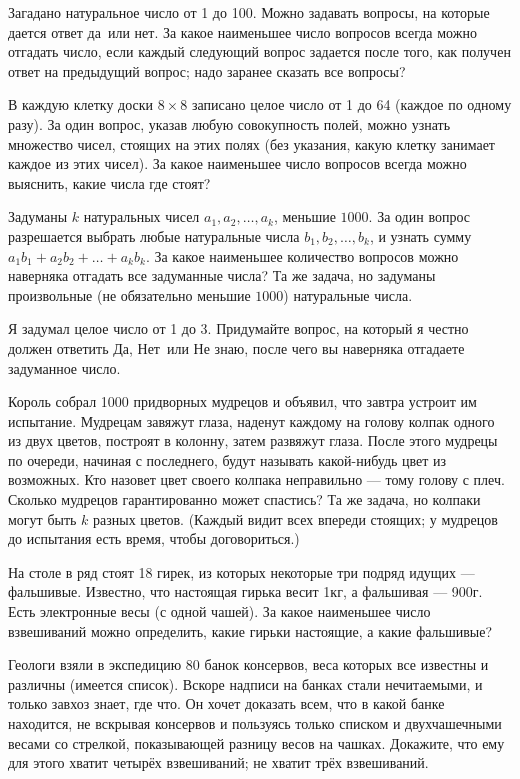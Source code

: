\documentclass[a4paper,12pt]{article}
\begin{document}

Загадано натуральное число от 1 до 100. Можно задавать вопросы,
на которые дается ответ  да\ или  нет. За какое наименьшее число
вопросов всегда можно отгадать число, если
каждый следующий вопрос задается после того, как
получен ответ на предыдущий вопрос;
надо заранее сказать все вопросы?


В каждую клетку доски $8\times8$ записано целое число от 1 до 64
(каждое по одному разу).
За один вопрос, указав любую совокупность полей, можно
узнать множество чисел, стоящих на этих полях
(без указания, какую клетку занимает каждое из этих чисел).
За какое наименьшее число
вопросов всегда можно выяснить, какие числа где стоят?



Задуманы $k$ натуральных чисел $a_1, a_2,\ldots ,a_k$, меньшие $1000$.
За один вопрос разрешается выбрать любые натуральные числа
$b_1, b_2,\ldots ,b_k$, и узнать сумму $a_1b_1+a_2b_2+\ldots +a_kb_k$.
За какое наименьшее количество вопросов можно наверняка
отгадать все задуманные числа?
 Та же задача, но задуманы произвольные (не обязательно
меньшие $1000$) натуральные числа.

Я задумал целое число от 1 до 3. Придумайте вопрос,
на который я честно должен ответить  Да,  Нет\
или  Не знаю,
после чего вы наверняка отгадаете задуманное число.

Король собрал 1000 придворных мудрецов и объявил, что завтра устроит им
испытание. Мудрецам завяжут глаза, наденут каждому на голову колпак одного
из двух цветов, построят в колонну, затем развяжут глаза.
После этого мудрецы по очереди, начиная с последнего, будут называть
какой-нибудь цвет из возможных.
Кто назовет цвет своего колпака неправильно --- тому голову с плеч.
Сколько мудрецов гарантированно может спастись?
 Та же задача, но колпаки могут быть $k$ разных цветов.\quad
(Каждый видит всех впереди
стоящих; у мудрецов до испытания есть время, чтобы договориться.)

На столе в ряд стоят 18 гирек, из которых некоторые три подряд идущих --- фальшивые. Известно, что настоящая гирька весит 1кг, а фальшивая --- 900г. Есть электронные весы (с одной чашей). За какое наименьшее число взвешиваний можно определить, какие гирьки настоящие, а какие фальшивые?
\кзадача


Геологи взяли в экспедицию 80 банок консервов, веса которых все известны
и различны (имеется список). Вскоре надписи на банках
стали нечитаемыми, и только завхоз знает, где что. Он хочет
доказать всем, что в какой банке находится, не вскрывая
консервов и пользуясь только списком и двухчашечными
весами со стрелкой, показывающей разницу весов на чашках. Докажите,
что ему для этого
 хватит четырёх взвешиваний;
\пункт не хватит трёх взвешиваний.
\end{document}
